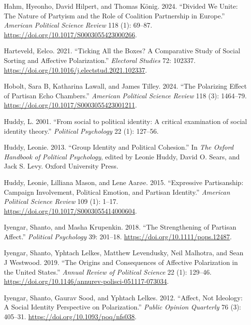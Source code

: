 \documentclass[
  12pt,
  a4paper,
  DIV=11,
  numbers=noendperiod]{scrartcl}
\newlength{\cslhangindent}
\newenvironment{CSLReferences}[2] %
 {\begin{list}{}{%
  \setlength{\itemindent}{0pt}
  \setlength{\leftmargin}{0pt}
  \setlength{\parsep}{0pt}
  \ifodd #1
   \setlength{\leftmargin}{\cslhangindent}
   \setlength{\itemindent}{-1\cslhangindent}
  \fi
  \setlength{\itemsep}{#2\baselineskip}}}
 {\end{list}}
\begin{document}
\begin{CSLReferences}{1}{0}
Hahm, Hyeonho, David Hilpert, and Thomas König. 2024. {``Divided We
Unite: The Nature of Partyism and the Role of Coalition Partnership in
Europe.''} \emph{American Political Science Review} 118 (1): 69--87.
\url{https://doi.org/10.1017/S0003055423000266}.

Harteveld, Eelco. 2021. {``Ticking All the Boxes? A Comparative Study of
Social Sorting and Affective Polarization.''} \emph{Electoral Studies}
72: 102337. \url{https://doi.org/10.1016/j.electstud.2021.102337}.

Hobolt, Sara B, Katharina Lawall, and James Tilley. 2024. {``The
Polarizing Effect of Partisan Echo Chambers.''} \emph{American Political
Science Review} 118 (3): 1464--79.
\url{https://doi.org/10.1017/S0003055423001211}.

Huddy, L. 2001. {``{From social to political identity: A critical
examination of social identity theory}.''} \emph{Political Psychology}
22 (1): 127--56.

Huddy, Leonie. 2013. {``Group Identity and Political Cohesion.''} In
\emph{The Oxford Handbook of Political Psychology}, edited by Leonie
Huddy, David O. Sears, and Jack S. Levy. Oxford University Press.

Huddy, Leonie, Lilliana Mason, and Lene Aarøe. 2015. {``Expressive
Partisanship: Campaign Involvement, Political Emotion, and Partisan
Identity.''} \emph{American Political Science Review} 109 (1): 1--17.
\url{https://doi.org/10.1017/S0003055414000604}.

Iyengar, Shanto, and Masha Krupenkin. 2018. {``The Strengthening of
Partisan Affect.''} \emph{Political Psychology} 39: 201--18.
\url{https://doi.org/10.1111/pops.12487}.

Iyengar, Shanto, Yphtach Lelkes, Matthew Levendusky, Neil Malhotra, and
Sean J Westwood. 2019. {``The Origins and Consequences of Affective
Polarization in the United States.''} \emph{Annual Review of Political
Science} 22 (1): 129--46.
\url{https://doi.org/10.1146/annurev-polisci-051117-073034}.

Iyengar, Shanto, Gaurav Sood, and Yphtach Lelkes. 2012. {``Affect, Not
Ideology: A Social Identity Perspective on Polarization.''} \emph{Public
Opinion Quarterly} 76 (3): 405--31.
\url{https://doi.org/10.1093/poq/nfs038}.


\end{CSLReferences}
\end{document}
